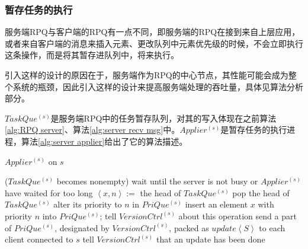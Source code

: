 		\subsubsection{暂存任务的执行}
			\par 服务端RPQ与客户端的RPQ有一点不同，即服务端的RPQ在接到来自上层应用，或者来自客户端的消息来插入元素、更改队列中元素优先级的时候，不会立即执行这条操作，而是将其暂存进队列中，将来执行。
			\par 引入这样的设计的原因在于，服务端作为RPQ的中心节点，其性能可能会成为整个系统的瓶颈，因此引入这样的设计来提高服务端处理的吞吐量，具体见算法分析部分。
			\par $TaskQue^{(s)}$是服务端RPQ中的任务暂存队列，对其的写入体现在之前算法\ref{alg:RPQ server}、算法\ref{alg:server recv msg}中。$Applier^{(s)}$是暂存任务的执行进程，算法\ref{alg:server applier}给出了它的算法描述。
			\begin{algorithm}
				\caption{$Applier^{(s)}$ on $s$}
				\label{alg:server applier}
				\Begin($TaskQue^{(s)}$ becomes nonempty)
				{
					{
						wait until the server is not busy or $Applier^{(s)}$ have waited for too long\;
						$\left\langle x,n\right\rangle :=$ the head of $TaskQue^{(s)}$\;
						pop the head of $TaskQue^{(s)}$\;
						{
							alter its priority to $n$ in $PriQue^{(s)}$\;
						}
						\Else
						{
							insert an element $x$ with priority $n$ into $PriQue^{(s)}$;
						}
						tell $VersionCtrl^{(s)}$ about this operation\;
						{
							send a part of $PriQue^{(s)}$, designated by $VersionCtrl^{(s)}$, packed as $update\left\langle S\right\rangle $ to each client connected to $s$\;
							tell $VersionCtrl^{(s)}$ that an update has been done\;
						}
					}
				}
			\end{algorithm}
